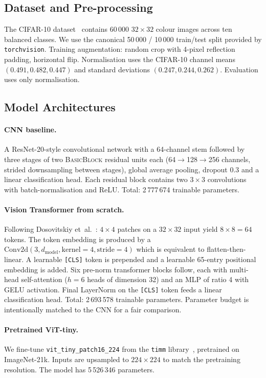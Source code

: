 \documentclass[runningheads]{llncs}
\begin{document}
\subsection{Dataset and Pre-processing}

The CIFAR-10 dataset~\cite{cifar10} contains 60\,000 $32\times 32$
colour images across ten balanced classes. We use the canonical 50\,000
/ 10\,000 train/test split provided by \texttt{torchvision}. Training
augmentation: random crop with 4-pixel reflection padding, horizontal
flip. Normalisation uses the CIFAR-10 channel means
$(0.491, 0.482, 0.447)$ and standard deviations
$(0.247, 0.244, 0.262)$. Evaluation uses only normalisation.

\subsection{Model Architectures}

\paragraph{CNN baseline.} A ResNet-20-style convolutional network with
a 64-channel stem followed by three stages of two \textsc{BasicBlock}
residual units each (64$\to$128$\to$256 channels, strided downsampling
between stages), global average pooling, dropout 0.3 and a linear
classification head. Each residual block contains two $3\times 3$
convolutions with batch-normalisation and ReLU. Total: 2\,777\,674
trainable parameters.

\paragraph{Vision Transformer from scratch.} Following Dosovitskiy
et~al.~\cite{vit}: $4\times 4$ patches on a $32\times 32$ input yield
$8\times 8 = 64$ tokens. The token embedding is produced by a
$\mathrm{Conv2d}(3, d_{\mathrm{model}}, \mathrm{kernel}=4, \mathrm{stride}=4)$
which is equivalent to flatten-then-linear. A learnable \texttt{[CLS]}
token is prepended and a learnable 65-entry positional embedding is
added. Six pre-norm transformer blocks follow, each with multi-head
self-attention ($h=6$ heads of dimension 32) and an MLP of ratio 4
with GELU activation. Final LayerNorm on the \texttt{[CLS]} token feeds
a linear classification head. Total: 2\,693\,578 trainable parameters.
Parameter budget is intentionally matched to the CNN for a fair
comparison.

\paragraph{Pretrained ViT-tiny.} We fine-tune
\texttt{vit\_tiny\_patch16\_224} from the \texttt{timm}
library~\cite{timm}, pretrained on ImageNet-21k. Inputs are upsampled
to $224\times 224$ to match the pretraining resolution. The model has
5\,526\,346 parameters.
\end{document}
